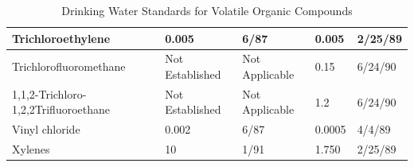 \begin{table}
\begin{tabular}{|l|l|l|l|l|}
Trichloroethylene                                                          & 0.005             & 6/87                                                                                                              & 0.005            & 2/25/89                                          \\ \hline
Trichlorofluoromethane                                                     & Not   Established & Not   Applicable                                                                                                  & 0.15             & 6/24/90                                          \\ \hline
1,1,2-Trichloro-   1,2,2Trifluoroethane                                    & Not   Established & Not   Applicable                                                                                                  & 1.2              & 6/24/90                                          \\ \hline
Vinyl   chloride                                                           & 0.002             & 6/87                                                                                                              & 0.0005           & 4/4/89                                           \\ \hline
Xylenes                                                                    & 10                & 1/91                                                                                                              & 1.750            & 2/25/89                                          \\ \hline
\end{tabular}
\caption{Drinking Water Standards for Volatile Organic Compounds}
\end{table}


